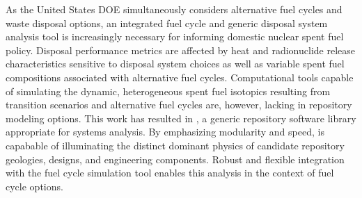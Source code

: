 As the United States \gls{DOE} simultaneously considers alternative fuel cycles 
and waste disposal options, an integrated fuel cycle and generic disposal system 
analysis tool is increasingly necessary for informing domestic nuclear spent 
fuel policy. Disposal performance metrics are affected by heat and radionuclide release 
characteristics sensitive to disposal system choices as well as variable spent 
fuel compositions associated  with alternative fuel cycles.  Computational 
tools capable of simulating the dynamic, heterogeneous spent fuel isotopics 
resulting from transition scenarios and alternative fuel cycles are, however, 
lacking in repository modeling  options.  This work has resulted in \Cyder, a 
generic repository software library appropriate for systems analysis.  By emphasizing 
modularity and speed, \Cyder is capabable of illuminating the distinct dominant 
physics of candidate repository geologies, designs, and engineering components. 
Robust and flexible integration with the \Cyclus fuel cycle simulation tool 
enables this analysis in the context of fuel cycle options.  

\glsresetall
